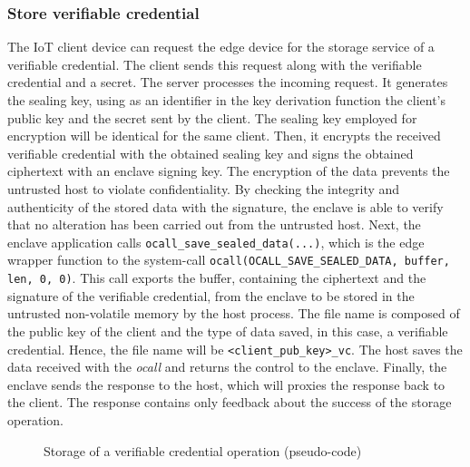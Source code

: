 \subsubsection{Store verifiable credential}
The IoT client device can request the edge device for the storage service of a verifiable credential.
The client sends this request along with the verifiable credential and a secret. The server processes the incoming request. It generates the sealing key, using as an identifier in the key derivation function the client's public key and the secret sent by the client. The sealing key employed for encryption will be identical for the same client. Then, it encrypts the received verifiable credential with the obtained sealing key and signs the obtained ciphertext with an enclave signing key. 
The encryption of the data prevents the untrusted host to violate confidentiality. By checking the integrity and authenticity of the stored data with the signature, the enclave is able to verify that no alteration has been carried out from the untrusted host.
Next, the enclave application calls \texttt{ocall\_save\_sealed\_data(...)}, which is the edge wrapper function to the system-call \texttt{ocall(OCALL\_SAVE\_SEALED\_DATA, buffer, len, 0, 0)}. This call exports the buffer, containing the ciphertext and the signature of the verifiable credential, from the enclave to be stored in the untrusted non-volatile memory by the host process. The file name is composed of the public key of the client and the type of data saved, in this case, a verifiable credential. Hence, the file name will be \texttt{<client\_pub\_key>\_vc}. 
The host saves the data received with the \textit{ocall} and returns the control to the enclave.  
Finally, the enclave sends the response to the host, which will proxies the response back to the client. The response contains only feedback about the success of the storage operation. \\

\begin{figure}[!tb]
    \centering
    
    \caption{Storage of a verifiable credential operation (pseudo-code)}
    \label{poc-store-vc}
\end{figure}
\newpage

